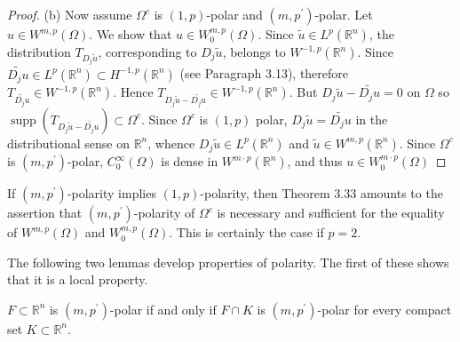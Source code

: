 \begin{proof}
  (b) Now assume $\Omega^c$ is $(1, p)$-polar and $\left(m, p^{\prime}\right)$-polar. Let $u \in W^{m, p}(\Omega)$. We show that $u \in W_0^{m, p}(\Omega)$. Since $\tilde{u} \in L^p\left(\mathbb{R}^n\right)$, the distribution $T_{D_j \tilde{u}}$, corresponding to $D_j \tilde{u}$, belongs to $W^{-1, p}\left(\mathbb{R}^n\right)$. Since $\widetilde{D_j u} \in L^p\left(\mathbb{R}^n\right) \subset H^{-1, p}\left(\mathbb{R}^n\right)$ (see Paragraph 3.13), therefore $T_{\widetilde{D_j u}} \in W^{-1, p}\left(\mathbb{R}^n\right)$. Hence $T_{D_j \tilde{u}-\widetilde{D_j u}} \in W^{-1, p}\left(\mathbb{R}^n\right)$. But $D_j \tilde{u}-\widetilde{D_j u}=0$ on $\Omega$ so $\operatorname{supp}\left(T_{D_j \tilde{u}-\widetilde{D_j u}}\right) \subset \Omega^c$. Since $\Omega^c$ is $(1, p)$ polar, $D_j \tilde{u}=\widetilde{D_j u}$ in the distributional sense on $\mathbb{R}^n$, whence $D_j \tilde{u} \in L^p\left(\mathbb{R}^n\right)$ and $\tilde{u} \in W^{m, p}\left(\mathbb{R}^n\right)$. Since $\Omega^c$ is $\left(m, p^{\prime}\right)$-polar, $C_0^{\infty}(\Omega)$ is dense in $W^{m \cdot p}\left(\mathbb{R}^n\right)$, and thus $u \in W_0^{m \cdot p}(\Omega)$
\end{proof}

\begin{para}
  If $\left(m, p^{\prime}\right)$-polarity implies $(1, p)$-polarity, then Theorem 3.33 amounts to the assertion that $\left(m, p^{\prime}\right)$-polarity of $\Omega^c$ is necessary and sufficient for the equality of $W^{m, p}(\Omega)$ and $W_0^{m, p}(\Omega)$. This is certainly the case if $p=2$.
\end{para}

The following two lemmas develop properties of polarity. The first of these shows that it is a local property.


\begin{lemma}
  $F \subset \mathbb{R}^n$ is $\left(m, p^{\prime}\right)$-polar if and only if $F \cap K$ is $\left(m, p^{\prime}\right)$-polar for every compact set $K \subset \mathbb{R}^n$.
\end{lemma}

